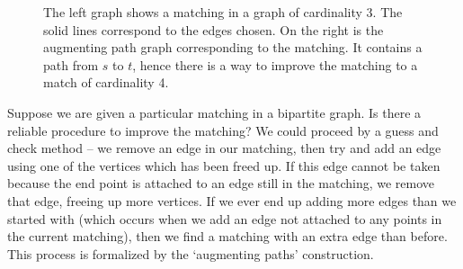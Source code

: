 \begin{figure}
\begin{center}
\end{center}
\caption{The left graph shows a matching in a graph of cardinality 3. The solid lines correspond to the edges chosen. On the right is the augmenting path graph corresponding to the matching. It contains a path from $s$ to $t$, hence there is a way to improve the matching to a match of cardinality 4.}
\end{figure}

Suppose we are given a particular matching in a bipartite graph. Is there a reliable procedure to improve the matching? We could proceed by a guess and check method -- we remove an edge in our matching, then try and add an edge using one of the vertices which has been freed up. If this edge cannot be taken because the end point is attached to an edge still in the matching, we remove that edge, freeing up more vertices. If we ever end up adding more edges than we started with (which occurs when we add an edge not attached to any points in the current matching), then we find a matching with an extra edge than before. This process is formalized by the `augmenting paths' construction.

